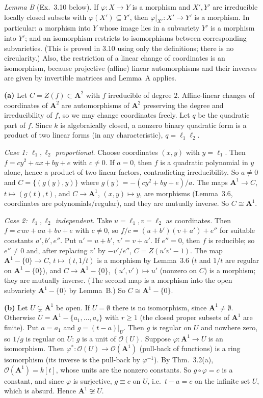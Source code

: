\documentclass[11pt]{article}
\begin{document}
\emph{Lemma B} (Ex.~3.10 below). If $\varphi:X\to Y$ is a morphism and $X',Y'$ are irreducible locally closed subsets with $\varphi(X')\subseteq Y'$, then $\varphi|_{X'}:X'\to Y'$ is a morphism. In particular: a morphism into $Y$ whose image lies in a subvariety $Y'$ is a morphism into $Y'$; and an isomorphism restricts to isomorphisms between corresponding subvarieties. (This is proved in 3.10 using only the definitions; there is no circularity.) Also, the restriction of a linear change of coordinates is an isomorphism, because projective (affine) linear automorphisms and their inverses are given by invertible matrices and Lemma~A applies.

\textbf{(a)} Let $C=Z(f)\subset\mathbf A^2$ with $f$ irreducible of degree $2$. Affine-linear changes of coordinates of $\mathbf A^2$ are automorphisms of $\mathbf A^2$ preserving the degree and irreducibility of $f$, so we may change coordinates freely. Let $q$ be the quadratic part of $f$. Since $k$ is algebraically closed, a nonzero binary quadratic form is a product of two linear forms (in any characteristic), $q=\ell_1\ell_2$.

\emph{Case 1: $\ell_1,\ell_2$ proportional.} Choose coordinates $(x,y)$ with $y=\ell_1$. Then $f=cy^2+ax+by+e$ with $c\neq0$. If $a=0$, then $f$ is a quadratic polynomial in $y$ alone, hence a product of two linear factors, contradicting irreducibility. So $a\ne0$ and $C=\{(g(y),y)\}$ where $g(y)=-(cy^2+by+e)/a$. The maps $\mathbf A^1\to C$, $t\mapsto(g(t),t)$, and $C\to\mathbf A^1$, $(x,y)\mapsto y$, are morphisms (Lemma~3.6, coordinates are polynomials/regular), and they are mutually inverse. So $C\cong\mathbf A^1$.

\emph{Case 2: $\ell_1,\ell_2$ independent.} Take $u=\ell_1,v=\ell_2$ as coordinates. Then $f=c\,uv+au+bv+e$ with $c\neq0$, so $f/c=(u+b')(v+a')+e''$ for suitable constants $a',b',e''$. Put $u'=u+b'$, $v'=v+a'$. If $e''=0$, then $f$ is reducible; so $e''\ne0$ and, after replacing $v'$ by $-v'/e''$, $C=Z(u'v'-1)$. The map $\mathbf A^1-\{0\}\to C$, $t\mapsto(t,1/t)$ is a morphism by Lemma~3.6 ($t$ and $1/t$ are regular on $\mathbf A^1-\{0\}$), and $C\to\mathbf A^1-\{0\}$, $(u',v')\mapsto u'$ (nonzero on $C$) is a morphism; they are mutually inverse. (The second map is a morphism into the open subvariety $\mathbf A^1-\{0\}$ by Lemma~B.) So $C\cong\mathbf A^1-\{0\}$.

\textbf{(b)} Let $U\subsetneq\mathbf A^1$ be open. If $U=\emptyset$ there is no isomorphism, since $\mathbf A^1\ne\emptyset$. Otherwise $U=\mathbf A^1-\{a_1,\dots,a_r\}$ with $r\ge1$ (the closed proper subsets of $\mathbf A^1$ are finite). Put $a=a_1$ and $g=(t-a)|_U$. Then $g$ is regular on $U$ and nowhere zero, so $1/g$ is regular on $U$: $g$ is a unit of $\mathcal O(U)$. Suppose $\varphi:\mathbf A^1\to U$ is an isomorphism. Then $\varphi^*:\mathcal O(U)\to\mathcal O(\mathbf A^1)$ (pull-back of functions) is a ring isomorphism (its inverse is the pull-back by $\varphi^{-1}$). By Thm.~3.2(a), $\mathcal O(\mathbf A^1)=k[t]$, whose units are the nonzero constants. So $g\circ\varphi=c$ is a constant, and since $\varphi$ is surjective, $g\equiv c$ on $U$, i.e.\ $t-a=c$ on the infinite set $U$, which is absurd. Hence $\mathbf A^1\not\cong U$.
\end{document}
